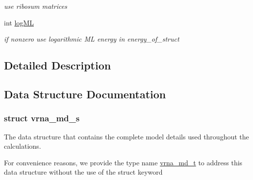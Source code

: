 \begin{DoxyCompactItemize}
\begin{DoxyCompactList}\small\item\em use ribosum matrices \end{DoxyCompactList}\item 
int \hyperlink{group__model__details_ga80c3c5fd35e7479704cc91d2d0367743}{log\+ML}\hypertarget{group__model__details_ga80c3c5fd35e7479704cc91d2d0367743}{}\label{group__model__details_ga80c3c5fd35e7479704cc91d2d0367743}

\begin{DoxyCompactList}\small\item\em if nonzero use logarithmic ML energy in energy\+\_\+of\+\_\+struct \end{DoxyCompactList}\end{DoxyCompactItemize}


\subsection{Detailed Description}


\subsection{Data Structure Documentation}
\label{structvrna__md__s}
\hypertarget{group__model__details_structvrna__md__s}{}
\subsubsection{struct vrna\+\_\+md\+\_\+s}
The data structure that contains the complete model details used throughout the calculations. 

For convenience reasons, we provide the type name \hyperlink{group__model__details_ga1f8a10e12a0a1915f2a4eff0b28ea17c}{vrna\+\_\+md\+\_\+t} to address this data structure without the use of the struct keyword

